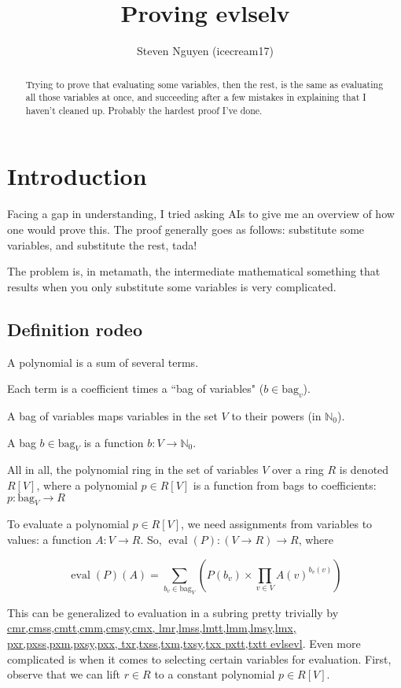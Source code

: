 \documentclass[]{article}
\title{Proving evlselv}
\author{Steven Nguyen (icecream17)}
\makeatletter
\DeclareMathOperator{\eval}{eval}
\newcommand{\bag}[1]{\mathrm{bag}_{#1}}
\newcommand{\theoremlink}[1]{\href{https://us.metamath.org/mpeuni/#1.html}{\midtilde{} #1}}
\newcommand\midtilde@raisedtilde[1][.5]{\raisebox{#1ex}{\texttildelow}}
\def\midtilde@normaltilde{\texttildelow}
\newcommand\midtilde%
{%
  \expandafter\in@\expandafter{\f@family}%
    {cmr,cmss,cmtt,cmm,cmsy,cmx,%
    lmr,lmss,lmtt,lmm,lmsy,lmx,%
    pxr,pxss,pxm,pxsy,pxx,%
    txr,txss,txm,txsy,txx}%
  \ifin@%
    \midtilde@raisedtilde%
  \else%
    \expandafter\in@\expandafter{\f@family}%
    {pxtt,txtt}%
    \ifin@%
      \midtilde@raisedtilde[.35]%
    \else%
      \midtilde@normaltilde%
    \fi%
  \fi%
}
\makeatother
\begin{document}
\maketitle

\begin{abstract}
Trying to prove that evaluating some variables, then the rest, is the same as evaluating all those variables at once, and succeeding after a few mistakes in explaining that I haven't cleaned up. Probably the hardest proof I've done.
\end{abstract}

\section{Introduction}

Facing a gap in understanding, I tried asking AIs to give me an overview of how one would prove this. The proof generally goes as follows: substitute some variables, and substitute the rest, tada!

The problem is, in metamath, the intermediate mathematical something that results when you only substitute some variables is very complicated.

\subsection{Definition rodeo}

A polynomial is a sum of several terms.

Each term is a coefficient times a ``bag of variables" ($b \in \mathrm{bag}_v$).

A bag of variables maps variables in the set $V$ to their powers (in $\mathbb{N}_0$).

\indent{}\indent{}A bag $b \in \mathrm{bag}_V$ is a function $b: V \to \mathbb{N}_0$.

\noindent{}All in all, the polynomial ring in the set of variables $V$ over a ring $R$ is denoted $R[V]$, where a polynomial $p \in R[V]$ is a function from bags to coefficients: $p: \bag{V} \to R$

To evaluate a polynomial $p \in R[V]$, we need assignments from variables to values: a function $A: V \to R$. So, $\eval(P): (V \to R) \to R$, where

\[ \eval(P)(A) = \sum_{b_v \in \bag{V}}\left(P(b_v) \times \prod_{v \in V}{A(v)^{b_v(v)}}\right) \tag{ev}\label{ev} \]

This can be generalized to evaluation in a subring pretty trivially by \theoremlink{evlsevl}. Even more complicated is when it comes to selecting certain variables for evaluation. First, observe that we can lift $r \in R$ to a constant polynomial $p \in R[V]$.
\end{document}

